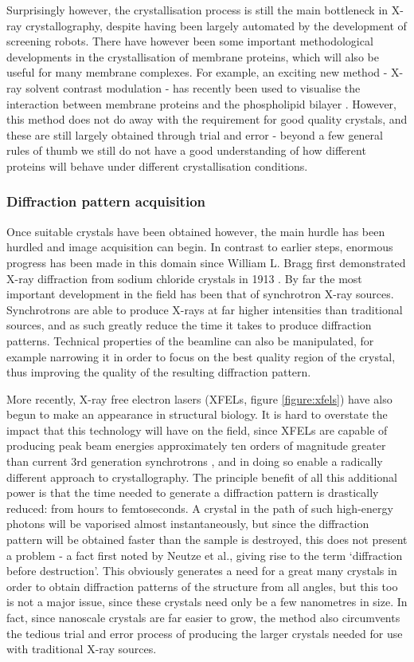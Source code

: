 \documentclass[a4paper,11pt,twoside,openright]{scrbook}
\begin{document}
Surprisingly however, the crystallisation process is still the main bottleneck in X-ray crystallography, despite having been largely automated by the development of screening robots. There have however been some important methodological developments in the crystallisation of membrane proteins, which will also be useful for many membrane complexes. For example, an exciting new method - X-ray solvent contrast modulation - has recently been used to visualise the interaction between membrane proteins and the phospholipid bilayer \cite{Norimatsu2017}. However, this method does not do away with the requirement for good quality crystals, and these are still largely obtained through trial and error - beyond a few general rules of thumb we still do not have a good understanding of how different proteins will behave under different crystallisation conditions.

\subsubsection{Diffraction pattern acquisition}
Once suitable crystals have been obtained however, the main hurdle has been hurdled and image acquisition can begin. In contrast to earlier steps, enormous progress has been made in this domain since William L. Bragg first demonstrated X-ray diffraction from sodium chloride crystals in 1913 \cite{Bragg1913}. By far the most important development in the field has been that of synchrotron X-ray sources. Synchrotrons are able to produce X-rays at far higher intensities than traditional sources, and as such greatly reduce the time it takes to produce diffraction patterns. Technical properties of the beamline can also be manipulated, for example narrowing it in order to focus on the best quality region of the crystal, thus improving the quality of the resulting diffraction pattern.

More recently, X-ray free electron lasers (XFELs, figure \ref{figure:xfels}) have also begun to make an appearance in structural biology. It is hard to overstate the impact that this technology will have on the field, since XFELs are capable of producing peak beam energies approximately ten orders of magnitude greater than current 3rd generation synchrotrons \cite{Shi2014}, and in doing so enable a radically different approach to crystallography. The principle benefit of all this additional power is that the time needed to generate a diffraction pattern is drastically reduced: from hours to femtoseconds. A crystal in the path of such high-energy photons will be vaporised almost instantaneously, but since the diffraction pattern will be obtained faster than the sample is destroyed, this does not present a problem - a fact first noted by Neutze et al.\cite{Neutze2000}, giving rise to the term `diffraction before destruction'. This obviously generates a need for a great many crystals in order to obtain diffraction patterns of the structure from all angles, but this too is not a major issue, since these crystals need only be a few nanometres in size. In fact, since nanoscale crystals are far easier to grow, the method also circumvents the tedious trial and error process of producing the larger crystals needed for use with traditional X-ray sources.
\end{document}
